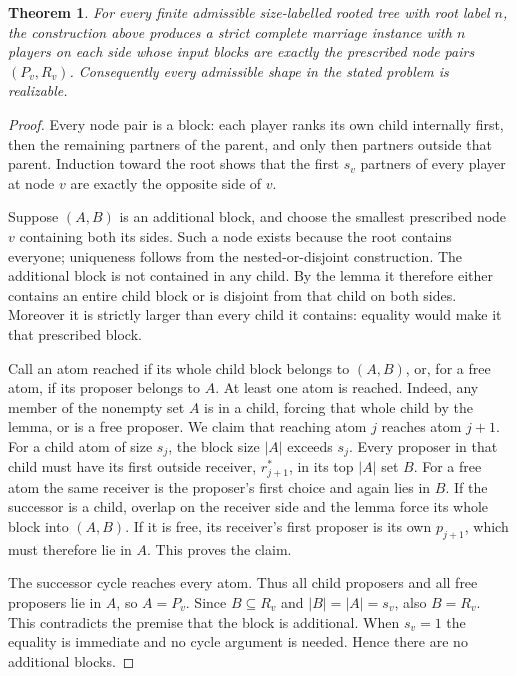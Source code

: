 \documentclass[11pt]{article}
\newtheorem{theorem}{Theorem}
\theoremstyle{definition}
\begin{document}
\begin{theorem}
For every finite admissible size-labelled rooted tree with root label
$n$, the construction above produces a strict complete marriage
instance with $n$ players on each side whose input blocks are exactly
the prescribed node pairs $(P_v,R_v)$. Consequently every admissible
shape in the stated problem is realizable.
\end{theorem}
\begin{proof}
Every node pair is a block: each player ranks its own child internally
first, then the remaining partners of the parent, and only then
partners outside that parent. Induction toward the root shows that
the first $s_v$ partners of every player at node $v$ are exactly the
opposite side of $v$.

Suppose $(A,B)$ is an additional block, and choose the smallest
prescribed node $v$ containing both its sides. Such a node exists
because the root contains everyone; uniqueness follows from the
nested-or-disjoint construction. The additional block is not
contained in any child. By the lemma it therefore either contains
an entire child block or is disjoint from that child on both sides.
Moreover it is strictly larger than every child it contains: equality
would make it that prescribed block.

Call an atom reached if its whole child block belongs to $(A,B)$,
or, for a free atom, if its proposer belongs to $A$. At least one
atom is reached. Indeed, any member of the nonempty set $A$ is in a
child, forcing that whole child by the lemma, or is a free proposer.
We claim that reaching atom $j$ reaches atom $j+1$. For a child atom
of size $s_j$, the block size $|A|$ exceeds $s_j$. Every proposer in
that child must have its first outside receiver, $r_{j+1}^*$, in its
top $|A|$ set $B$. For a free atom the same receiver is the proposer's
first choice and again lies in $B$. If the successor is a child,
overlap on the receiver side and the lemma force its whole block
into $(A,B)$. If it is free, its receiver's first proposer is its own
$p_{j+1}$, which must therefore lie in $A$. This proves the claim.

The successor cycle reaches every atom. Thus all child proposers and
all free proposers lie in $A$, so $A=P_v$. Since $B\subseteq R_v$ and
$|B|=|A|=s_v$, also $B=R_v$. This contradicts the premise that the block
is additional. When $s_v=1$ the equality is immediate and no cycle
argument is needed. Hence there are no additional blocks.
\end{proof}
\end{document}
